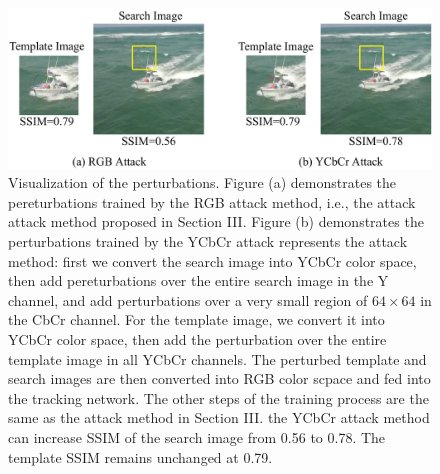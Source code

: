 \documentclass[12pt]{article}
\begin{document}
\begin{figure}[t]
  \centering
  \includegraphics[width=.8\textwidth]{images_imperceptible/1.pdf}
  \caption{Visualization of the perturbations.
  Figure (a) demonstrates the pereturbations trained by the RGB attack method, i.e., the attack attack method proposed in Section III.
  Figure (b) demonstrates the perturbations trained by the YCbCr attack represents the attack method: first we convert the search image into YCbCr color space, then add pereturbations over the entire search image in the Y channel, and add perturbations over a very small region of $64 \times 64$ in the CbCr channel. 
  For the template image, we convert it into YCbCr color space, then add the perturbation over the entire template image in all YCbCr channels.
  The perturbed template and search images are then converted into RGB color scpace and fed into the tracking network.
  The other steps of the training process are the same as the attack method in Section III.
  the YCbCr attack method can increase SSIM of the search image from 0.56 to 0.78. The template SSIM remains unchanged at 0.79.}
  \label{fig:YCbCr1}
\end{figure}
\end{document}
